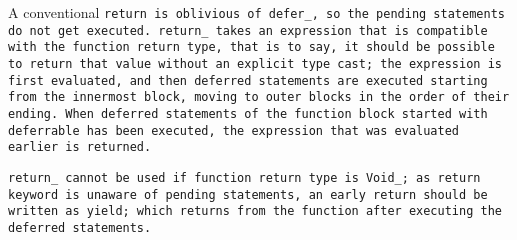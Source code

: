 A conventional \tt{return} is oblivious of \tt{defer_},
so the pending statements do not get executed.
\tt{return_} takes an expression that is compatible with the function
return type, that is to say, it should be possible to return that
value without an explicit type cast; the expression is first evaluated,
and then deferred statements are executed starting from the innermost block,
moving to outer blocks in the order of their ending.
When deferred statements of the function block started with \tt{deferrable}
has been executed, the expression that was evaluated earlier is returned.

\tt{return_} cannot be used if function return type is \tt{Void_};
as \tt{return} keyword is unaware of pending statements,
an early return should be written as \tt{yield;} which returns
from the function after executing the deferred statements.
